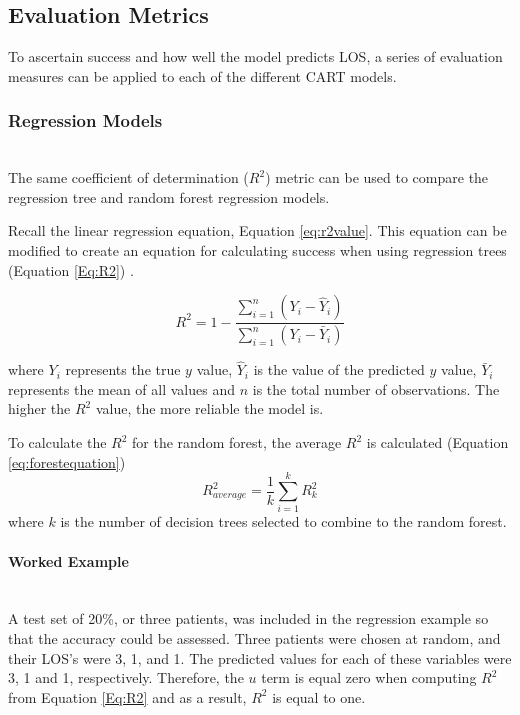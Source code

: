\documentclass[../thesis.tex]{subfiles}
\begin{document}
\subsection{Evaluation Metrics}
To ascertain success and how well the model predicts LOS, a series of evaluation measures can be applied to each of the different CART models.

\subsubsection{Regression Models}\\
The same coefficient of determination ($R^2$) metric can be used to compare the regression tree and random forest regression models. 
\textcolor{blue}{}

Recall the linear regression equation, Equation \eqref{eq:r2value}. This equation can be modified to create an equation for calculating success when using regression trees (Equation \eqref{Eq:R2}) \textcolor{blue}{\cite{Chicco2021}}.

\begin{equation}\label{Eq:R2}
    R^{2} = 1 - \frac{\sum^n_{i=1} (Y_{i}- \hat{Y}_{i})}{\sum^{n}_{i=1} (Y_{i} -\bar{Y}_{i})}
\end{equation}

where $Y_{i}$ represents the true $y$ value, $\hat {Y}_i$ is the value of the predicted $y$ value, $\bar Y_{i}$ represents the mean of all values and $n$ is the total number of observations. The higher the $R^{2}$ value, the more reliable the model is.

To calculate the $R^{2}$ for the random forest, the average $R^{2}$ is calculated (Equation \eqref{eq:forestequation}) 
\begin{equation}\label{eq:forestequation}
    R^{2}_{average} = \frac{1}{k}\sum_{i=1}^{k}R^{2}_{k}
\end{equation}
where $k$ is the number of decision trees selected to combine to the random forest.

\paragraph{Worked Example}\\
A test set of 20\%, or three patients, was included in the regression example so that the accuracy could be assessed. Three patients were chosen at random, and their LOS's were 3, 1, and 1. The predicted values for each of these variables were 3, 1 and 1, respectively. Therefore, the $u$ term is equal zero when computing $R^{2}$ from Equation \eqref{Eq:R2} and as a result, $R^{2}$ is equal to one.
\end{document}
